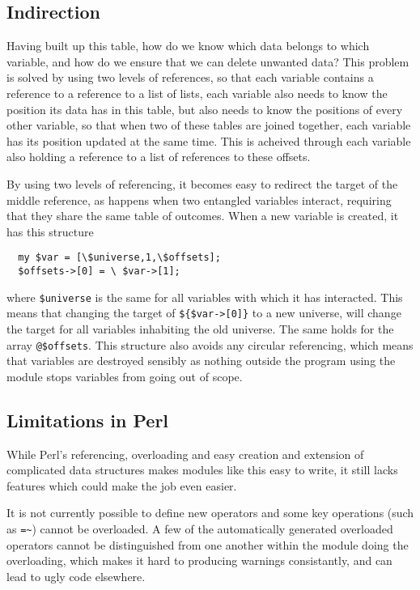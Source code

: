 \documentclass{article}      %
\newcommand{\pvar}[1]{\texttt{\$#1}} %
\newcommand{\ptt}[1]{\texttt{#1}}    %
\begin{document}
\subsection{Indirection}

Having built up this table, how do we know which data belongs to which
variable, and how do we ensure that we can delete unwanted data?
This problem is solved by using two levels of references, so that each
variable contains a reference to a reference to a list of lists, each
variable also needs to know the position its data has in this table,
but also needs to know the positions of every other variable, so that
when two of these tables are joined together, each variable has its
position updated at the same time.
This is acheived through each variable also holding a reference to a
list of references to these offsets.

By using two levels of referencing, it becomes easy to redirect the
target of the middle reference, as happens when two entangled
variables interact, requiring that they share the same table of
outcomes.  When a new variable is created, it has this structure
\begin{verbatim}
  my $var = [\$universe,1,\$offsets];
  $offsets->[0] = \ $var->[1];
\end{verbatim} %
where \pvar{universe} is the same for all variables with which it has
interacted.  This means that changing the target of \verb+${$var->[0]}+ to a
new universe, will change the target for all variables inhabiting the old
universe. The same
holds for the array \ptt{@\$offsets}.  This structure also avoids any
circular referencing, which means that variables are destroyed
sensibly as nothing outside the program using the module stops
variables from going out of scope.

\subsection{Limitations in Perl}

While Perl's referencing, overloading and easy creation and extension
of complicated data structures makes modules like this easy to
write, it still lacks features which could make the job even easier.

It is not currently possible to define new operators and
some key operations (such as \verb+=~+) cannot be overloaded.  A few of
the automatically generated overloaded operators cannot be
distinguished from one another within the module doing the
overloading, which makes it hard to producing warnings consistantly,
and can lead to ugly code elsewhere.
\end{document}
